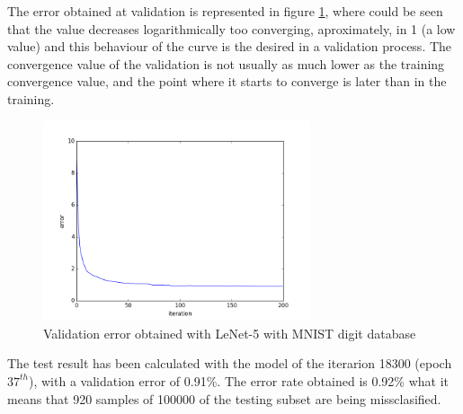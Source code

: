 The error obtained at validation is represented in figure \ref{fig:Lenetresult}, where could be seen that the value decreases logarithmically too converging, aproximately, in 1 (a low value) and this behaviour of the curve is the desired in a validation process. The convergence value of the validation is not usually as much lower as the training convergence value, and the point where it starts to converge is later than in the training.\\

\begin{figure}[htb]
\centering
\includegraphics[width=0.7\textwidth]{images/ModificandoLenet/error_lenet.png}
\caption{Validation error obtained with LeNet-5 with MNIST digit database} \label{fig:Lenetresult}
\end{figure}

The test result has been calculated with the model of the iterarion 18300 (epoch $37^{th}$), with a validation error of 0.91\%. The error rate obtained is 0.92\% what it means that 920 samples of 100000 of the testing subset are being missclasified.\\




